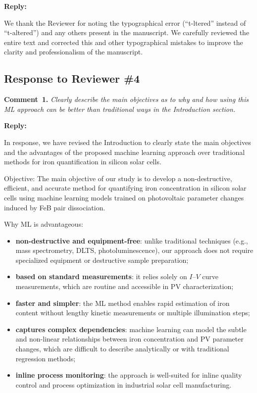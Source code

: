 \documentclass[a4paper,fleqn]{cas-sc}
\begin{document}
\noindent
\textcolor[rgb]{0.51,0.00,0.00}{\textbf{Reply:}}

We thank the Reviewer for noting the typographical error (“t-ltered” instead of “t-altered”) and any others present in the manuscript.
We carefully reviewed the entire text and corrected this and other typographical mistakes to improve the clarity and professionalism of the manuscript.

\vspace{1cm}
\subsection*{Response to Reviewer \#4 }

\noindent
\textcolor[rgb]{0.00,0.50,1.00}{\textbf{Comment~1.}}
\emph{Clearly describe the main objectives as to why and how using this ML approach can be better than traditional ways in the Introduction section.}

\noindent
\textcolor[rgb]{0.51,0.00,0.00}{\textbf{Reply:}}


In response, we have revised the Introduction to clearly state the main objectives and the advantages of the proposed machine learning approach over traditional methods for iron quantification in silicon solar cells.


Objective:
The main objective of our study is to develop a non-destructive, efficient, and accurate method for quantifying iron concentration in silicon solar cells using machine learning models trained on photovoltaic parameter changes induced by FeB pair dissociation.


Why ML is advantageous:
\begin{itemize}
    \item \textbf{non-destructive and equipment-free}: unlike traditional techniques (e.g., mass spectrometry, DLTS, photoluminescence), our approach does not require specialized equipment or destructive sample preparation;
    \item \textbf{based on standard measurements}: it relies solely on $I$–$V$ curve measurements, which are routine and accessible in PV characterization;
    \item \textbf{faster and simpler}: the ML method enables rapid estimation of iron content without lengthy kinetic measurements or multiple illumination steps;
    \item \textbf{captures complex dependencies}: machine learning can model the subtle and non-linear relationships between iron concentration and PV parameter changes, which are difficult to describe analytically or with traditional regression methods;
    \item \textbf{inline process monitoring}: the approach is well-suited for inline quality control and process optimization in industrial solar cell manufacturing.
\end{itemize}
\end{document}
